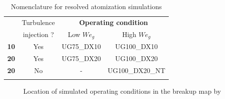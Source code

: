 
\begin{table}[!h]
\centering
\caption{Nomenclature for resolved atomization simulations}
\begin{tabular}{cccc}
\thickhline
\multirow{2}{*}{ $\Delta x_\mathrm{min}$ [$\mu$m] } & Turbulence & \multicolumn{2}{c}{\textbf{Operating condition}} \\ 
\cline{3-4}
 & injection ? & Low $We_g$ &  High $We_g$ \\ 
\thickhline
\textbf{10} & Yes & UG75\_DX10 & UG100\_DX10 \\
\textbf{20} & Yes & UG75\_DX20 & UG100\_DX20 \\
\textbf{20} & No & - & UG100\_DX20\_NT \\
\thickhline
\end{tabular}
\label{tab:jicf_resolved_simulations_performed}
\end{table}


\begin{figure}[ht]
     \centering
     \caption{Location of simulated operating conditions in the breakup map by \citeColor[wu_breakup_1997]}
      \label{fig:location_JICF_ops_in_breakup_map}
\end{figure}




